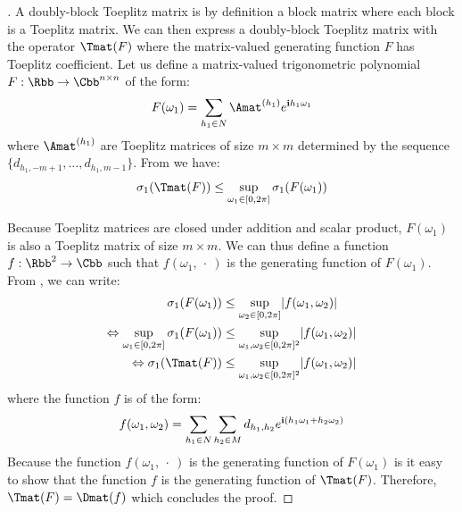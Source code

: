 \begin{proof}[]
  A doubly-block Toeplitz matrix is by definition a block matrix where each block is a Toeplitz matrix.
  We can then express a doubly-block Toeplitz matrix with the operator $\Tmat(F)$ where the matrix-valued generating function $F$ has Toeplitz coefficient.
  Let us define a matrix-valued trigonometric polynomial $F:\Rbb\rightarrow\Cbb^{n \times n}$ of the form:
  \begin{equation}
    F(\omega_1) = \sum_{h_1 \in N} \Amat^{(h_1)} e^{\ci h_1\omega_1}
  \end{equation}
  where $\Amat^{(h_1)}$ are Toeplitz matrices of size $m \times m$ determined by the sequence $\{d_{h_1, -m+1}, \dots, d_{h_1, m-1} \}$. 
  From  we have:
  \begin{equation}
  \sigma_1\left(\Tmat(F) \right) \leq \sup_{\omega_1 \in [0,2\pi] } \sigma_{1}\left( F(\omega_1) \right) \label{equation:th_bound_block_toeplitz}
  \end{equation}

  Because Toeplitz matrices are closed under addition and scalar product, $F(\omega_1)$ is also a Toeplitz matrix of size $m \times m$. 
  We can thus define a function $f:\Rbb^{2} \rightarrow \Cbb$ such that $f(\omega_1,\ \cdot\ )$ is the generating function of $F(\omega_1)$. From , we can write:
  \begin{align}
      \sigma_{1}\left( F(\omega_1) \right) &\leq \sup_{\omega_2 \in [0,2\pi]} \left| f(\omega_1, \omega_2) \right| \\
      \Leftrightarrow \sup_{\omega_1 \in [0,2\pi]} \sigma_{1}\left( F(\omega_1) \right) &\leq  \sup_{\omega_1, \omega_2 \in [0,2\pi]^2} \left| f(\omega_1, \omega_2) \right| \\
      \Leftrightarrow \sigma_1\left(\Tmat(F) \right) &\leq \sup_{\omega_1, \omega_2 \in [0,2\pi]^2} \left| f(\omega_1, \omega_2) \right|
  \end{align}
  where the function $f$ is of the form:
  \begin{equation}
  f(\omega_1,\omega_2) = \sum_{h_1 \in N} \sum_{h_2 \in M} d_{h_1, h_2} e^{\ci \left( h_1\omega_1 + h_2 \omega_2\right)}
  \end{equation}
  Because the function $f(\omega_1,\ \cdot\ )$ is the generating function of $F(\omega_1)$ is it easy to show that the function $f$ is the generating function of $\Tmat(F)$. Therefore, $\Tmat(F) = \Dmat(f)$ which concludes the proof. 
\end{proof}


